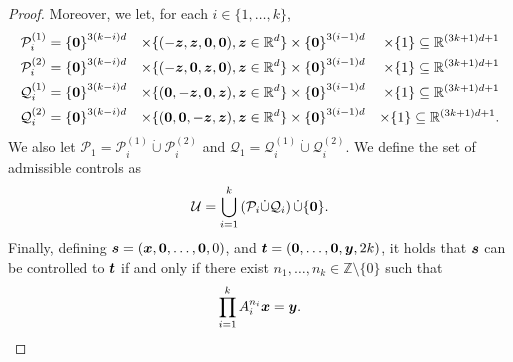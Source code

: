 \begin{proof}
Moreover, we let, for each $i \in \lbrace 1, \ldots, k \rbrace$,
\begin{align*}
\mathcal{P}_{i}^{(1)} &= {\lbrace \boldsymbol{0} \rbrace}^{3(k-i)d} &\times
\lbrace (-\boldsymbol{z}, \boldsymbol{z}, \boldsymbol{0}, \boldsymbol{0}), \boldsymbol{z} \in \mathbb{R}^{d} \rbrace &\times
{\lbrace \boldsymbol{0} \rbrace}^{3(i-1)d} &\times \lbrace 1 \rbrace
\subseteq \mathbb{R}^{(3k+1)d+1} \\
\mathcal{P}_{i}^{(2)} &= {\lbrace \boldsymbol{0} \rbrace}^{3(k-i)d} &\times
\lbrace (-\boldsymbol{z}, \boldsymbol{0}, \boldsymbol{z}, \boldsymbol{0}), \boldsymbol{z} \in \mathbb{R}^{d} \rbrace &\times
{\lbrace \boldsymbol{0} \rbrace}^{3(i-1)d} &\times \lbrace 1 \rbrace
\subseteq \mathbb{R}^{(3k+1)d+1} \\
\mathcal{Q}_{i}^{(1)} &= {\lbrace \boldsymbol{0} \rbrace}^{3(k-i)d} &\times
\lbrace (\boldsymbol{0}, -\boldsymbol{z}, \boldsymbol{0}, \boldsymbol{z}), \boldsymbol{z} \in \mathbb{R}^{d} \rbrace &\times
{\lbrace \boldsymbol{0} \rbrace}^{3(i-1)d} &\times \lbrace 1 \rbrace
\subseteq \mathbb{R}^{(3k+1)d+1} \\
\mathcal{Q}_{i}^{(2)} &= {\lbrace \boldsymbol{0} \rbrace}^{3(k-i)d} &\times
\lbrace (\boldsymbol{0}, \boldsymbol{0}, -\boldsymbol{z}, \boldsymbol{z}), \boldsymbol{z} \in \mathbb{R}^{d} \rbrace &\times
{\lbrace \boldsymbol{0} \rbrace}^{3(i-1)d} &\times \lbrace 1 \rbrace
\subseteq \mathbb{R}^{(3k+1)d+1}.
\end{align*}
We also let $\mathcal{P}_{1} = \mathcal{P}_{i}^{(1)} \dot{\cup} \mathcal{P}_{i}^{(2)}$ and $\mathcal{Q}_{1} = \mathcal{Q}_{i}^{(1)} \dot{\cup} \mathcal{Q}_{i}^{(2)}$.
We define the set of admissible controls as
\begin{align*}
\mathcal{U} = \bigcup\limits_{i=1}^{k} \left( \mathcal{P}_{i} \dot{\cup} \mathcal{Q}_{i} \right) \dot{\cup} \lbrace \boldsymbol{0} \rbrace.
\end{align*}
Finally, defining $\boldsymbol{s} = (\boldsymbol{x}, \boldsymbol{0}, \ldots, \boldsymbol{0}, 0)$, and $\boldsymbol{t} = (\boldsymbol{0}, \ldots, \boldsymbol{0}, \boldsymbol{y}, 2k)$, it holds that $\boldsymbol{s}$ can be controlled to $\boldsymbol{t}$ if and only if there exist $n_{1}, \ldots, n_{k} \in \mathbb{Z} \setminus \lbrace 0 \rbrace$ such that
\begin{equation*}
\prod\limits_{i=1}^{k}A_{i}^{n_{i}} \boldsymbol{x} = \boldsymbol{y}.
\end{equation*}


\end{proof}
